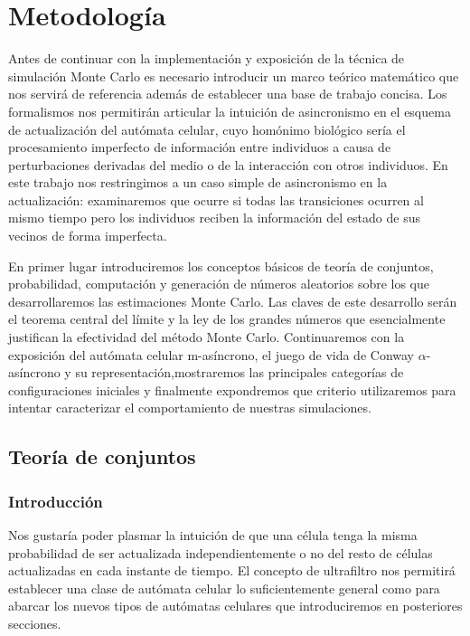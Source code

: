 \documentclass[../proyecto.tex]{memoir}
\begin{document}
\chapter{Metodología}

Antes de continuar con la implementación y exposición de la técnica de simulación Monte Carlo es necesario introducir un marco teórico matemático que nos servirá de referencia además de establecer una base de trabajo concisa. Los formalismos nos permitirán articular la intuición de asincronismo en el esquema de actualización del autómata celular, cuyo homónimo biológico sería el procesamiento imperfecto de información entre individuos a causa de perturbaciones derivadas del medio o de la interacción con otros individuos. En este trabajo nos restringimos a un caso simple de asincronismo en la actualización: examinaremos que ocurre si todas las transiciones ocurren al mismo tiempo pero los individuos reciben la información del estado de sus vecinos de forma imperfecta.

En primer lugar introduciremos los conceptos básicos de teoría de conjuntos, probabilidad, computación y generación de números aleatorios sobre los que desarrollaremos las estimaciones Monte Carlo. Las claves de este desarrollo serán el teorema central del límite y la ley de los grandes números que esencialmente justifican la efectividad del método Monte Carlo. Continuaremos con la exposición del autómata celular m-asíncrono, el juego de vida de Conway $\alpha$-asíncrono y su representación,mostraremos las principales categorías de configuraciones iniciales y finalmente expondremos que criterio utilizaremos para intentar caracterizar el comportamiento de nuestras simulaciones.

\section{Teoría de conjuntos}

\subsection{Introducción}

Nos gustaría poder plasmar la intuición de que una célula tenga la misma probabilidad de ser actualizada independientemente o no del resto de células actualizadas en cada instante de tiempo. El concepto de ultrafiltro nos permitirá establecer una clase de autómata celular lo suficientemente general como para abarcar los nuevos tipos de autómatas celulares que introduciremos en posteriores secciones. 
\end{document}
